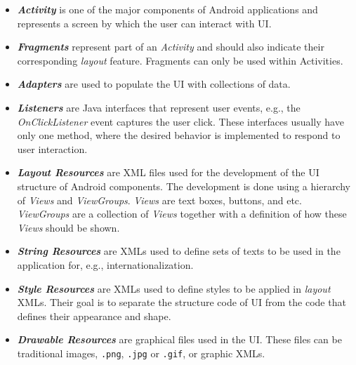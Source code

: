 \begin{itemize}

	\item \textbf{\textit{Activity}} is one of the major components of Android applications and represents a screen by which the user can interact with \acs {UI}. 

	\item \textbf{\textit{Fragments}} represent part of an \textit{Activity} and should also indicate their corresponding \textit{layout} feature. Fragments can only be used within Activities. 

	\item \textbf{\textit{Adapters}} are used to populate the \acs{UI} with collections of data.

	\item \textbf{\textit{Listeners}} are Java interfaces that represent user events, e.g., the \textit{OnClickListener} event captures the user click. These interfaces usually have only one method, where the desired behavior is implemented to respond to user interaction.

	\item \textbf{\textit{Layout Resources}} are XML files used for the development of the \acs{UI} structure of Android components. The development is done using a hierarchy of \textit {Views} and \textit {ViewGroups}. \textit{Views} are text boxes, buttons, and etc. \textit {ViewGroups} are a collection of \textit{Views} together with a definition of how these \textit {Views} should be shown.

	\item \textbf{\textit{String Resources}} are XMLs used to define sets of texts to be used in the application for, e.g., internationalization.

	\item \textbf{\textit{Style Resources}} are XMLs used to define styles to be applied in \textit {layout} XMLs. Their goal is to separate the structure code of \acs {UI} from the code that defines their appearance and shape.

	\item \textbf{\textit{Drawable Resources}} are graphical files used in the \acs{UI}. These files can be traditional images, \texttt {.png}, \texttt{.jpg} or \texttt {.gif}, or graphic XMLs. 

\end{itemize}